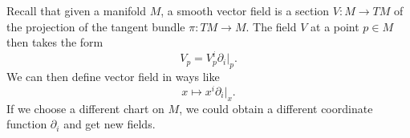 
Recall that given a manifold $M$, a smooth vector field is a section $V : M \to TM$ of the projection of the tangent bundle $\pi : TM \to M$. The field $V$ at a point $p\in M$ then takes the form
\[
	V_p = V_p ^i \partial _i|_p
.\]
We can then define vector field in ways like
\[
	x\mapsto x^i \partial _i|_{x} 
.\]
If we choose a different chart on $M$, we could obtain a different coordinate function $\partial _i$ and get new fields.
